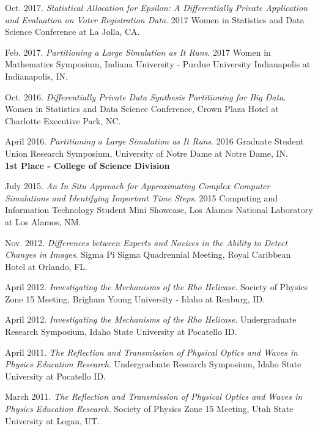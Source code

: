 \documentclass[11pt, letterpaper, roman]{moderncv} %
\begin{document}
\begin{etaremune}[topsep=0pt, itemsep=5pt, partopsep=0pt, parsep=0pt]
    \item Oct. 2017. \textit{Statistical Allocation for Epsilon: A Differentially Private Application and Evaluation on Voter Registration Data}. 2017 Women in Statistics and Data Science Conference at La Jolla, CA.
    
    \item Feb. 2017. \textit{Partitioning a Large Simulation as It Runs}. 2017 Women in Mathematics Symposium, Indiana University - Purdue University Indianapolis at Indianapolis, IN.
    
    \item Oct. 2016. \textit{Differentially Private Data Synthesis Partitioning for Big Data}. Women in Statistics and Data Science Conference, Crown Plaza Hotel at Charlotte Executive Park, NC. 
    
    \item April 2016. \textit{Partitioning a Large Simulation as It Runs}. 2016 Graduate Student Union Research Symposium, University of Notre Dame at Notre Dame, IN.\\
    \textbf{1st Place - College of Science Division}
    
    \item July 2015. \textit{An In Situ Approach for Approximating Complex Computer Simulations and Identifying Important Time Steps}. 2015 Computing and Information Technology Student Mini Showcase, Los Alamos National Laboratory at Los Alamos, NM.
    
    \item Nov. 2012. \textit{Differences between Experts and Novices in the Ability to Detect Changes in Images}. Sigma Pi Sigma Quadrennial Meeting, Royal Caribbean Hotel at Orlando, FL.
    
    \item April 2012. \textit{Investigating the Mechanisms of the Rho Helicase}. Society of Physics Zone 15 Meeting, Brigham Young University - Idaho at Rexburg, ID.
    
    \item April 2012. \textit{Investigating the Mechanisms of the Rho Helicase}. Undergraduate Research Symposium, Idaho State University at Pocatello ID.
    
    \item April 2011. \textit{The Reflection and Transmission of Physical Optics and Waves in Physics Education Research}. Undergraduate Research Symposium, Idaho State University at Pocatello ID.
    
    \item March 2011. \textit{The Reflection and Transmission of Physical Optics and Waves in Physics Education Research}. Society of Physics Zone 15 Meeting, Utah State University at Logan, UT.
\end{etaremune}
\end{document}
